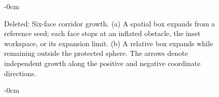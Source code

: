 \documentclass[electronics,article,submit,moreauthors]{Definitions/mdpi}
\providecommand{\DIFaddbegin}{}\providecommand{\DIFaddend}{} %
\begin{document}
\begin{figure}[htbp]
\begin{adjustwidth}{-\extralength}{0cm}
\begin{mdframed}[linecolor=RevisionRed,linewidth=.65pt,innerleftmargin=2pt,innerrightmargin=2pt,innertopmargin=3pt,innerbottommargin=3pt]
{}
\caption*{\textcolor{RevisionRed}{Deleted:} Six-face corridor growth. (a) A spatial box expands from a reference seed; each face stops at an inflated obstacle, the inset workspace, or its expansion limit. (b) A relative box expands while remaining outside the protected sphere. The arrows denote independent growth along the positive and negative coordinate directions.}
\end{mdframed}
\end{adjustwidth}
\end{figure}

\DIFdelend \DIFaddbegin \begin{figure}[htbp]
\begin{adjustwidth}{-\extralength}{0cm}
\begin{mdframed}[linecolor=RevisionBlue,linewidth=.65pt,innerleftmargin=2pt,innerrightmargin=2pt,innertopmargin=3pt,innerbottommargin=3pt]
\color{RevisionBlue}
\setlength{\textwidth}{\linewidth}\setlength{\fulllength}{\linewidth}


\end{mdframed}
\end{adjustwidth}
\end{figure}
\end{document}
